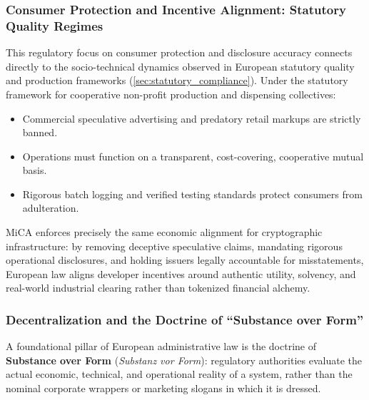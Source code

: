 \documentclass[a4paper,11pt,twoside,parskip=half-,headings=small]{scrartcl}
\begin{document}
\subsubsection{Consumer Protection and Incentive Alignment: Statutory Quality Regimes}
This regulatory focus on consumer protection and disclosure accuracy connects directly to the socio-technical dynamics observed in European statutory quality and production frameworks (\cref{sec:statutory_compliance}). Under the statutory framework for cooperative non-profit production and dispensing collectives:
\begin{itemize}
  \item Commercial speculative advertising and predatory retail markups are strictly banned.
  \item Operations must function on a transparent, cost-covering, cooperative mutual basis.
  \item Rigorous batch logging and verified testing standards protect consumers from adulteration.
\end{itemize}
MiCA enforces precisely the same economic alignment for cryptographic infrastructure: by removing deceptive speculative claims, mandating rigorous operational disclosures, and holding issuers legally accountable for misstatements, European law aligns developer incentives around authentic utility, solvency, and real-world industrial clearing rather than tokenized financial alchemy.

\subsubsection{Decentralization and the Doctrine of ``Substance over Form''}
A foundational pillar of European administrative law is the doctrine of \textbf{Substance over Form} (\emph{Substanz vor Form}): regulatory authorities evaluate the actual economic, technical, and operational reality of a system, rather than the nominal corporate wrappers or marketing slogans in which it is dressed.
\end{document}
